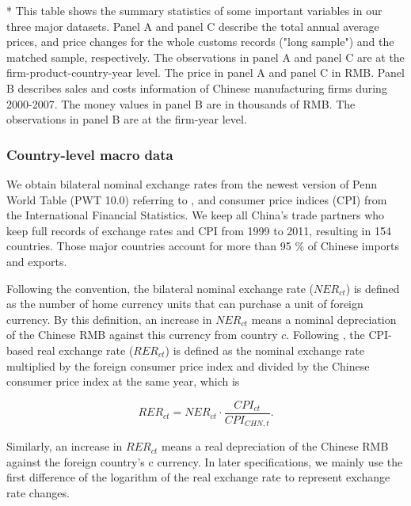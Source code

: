 \documentclass[12pt]{article}
\begin{document}
\begin{table}[htbp]
{\begin{threeparttable}
\begin{tabular}{lcccccc}
		\bottomrule
	\end{tabular}
	\begin{tablenotes}
		\footnotesize
		\item[*] This table shows the summary statistics of some important variables in our three major datasets. Panel A and panel C describe the total annual average prices, and price changes for the whole customs records ("long sample") and the matched sample, respectively. The observations in panel A and panel C are at the firm-product-country-year level. The price in panel A and panel C in RMB. Panel B describes sales and costs information of Chinese manufacturing firms during 2000-2007. The money values in panel B are in thousands of RMB. The observations in panel B are at the firm-year level.
	\end{tablenotes}
	\end{threeparttable}
        }
\end{table}

\subsubsection{Country-level macro data} \label{Data-Macro}

We obtain bilateral nominal exchange rates from the newest version of Penn World Table (PWT 10.0) referring to \cite{feenstra2015}, and consumer price indices (CPI) from the International Financial Statistics. We keep all China's trade partners who keep full records of exchange rates and CPI from 1999 to 2011, resulting in 154 countries. Those major countries account for more than 95 \% of Chinese imports and exports.

Following the convention, the bilateral nominal exchange rate ($NER_{ct}$) is defined as the number of home currency units that can purchase a unit of foreign currency. By this definition, an increase in $NER_{ct}$ means a nominal depreciation of the Chinese RMB against this currency from country $c$. Following \cite{lmx2015}, the CPI-based real exchange rate ($RER_{ct}$) is defined as the nominal exchange rate multiplied by the foreign consumer price index and divided by the Chinese consumer price index at the same year, which is

$$
RER_{ct}=NER_{ct} \cdot \frac{CPI_{ct}}{CPI_{CHN,t}}.
$$

Similarly, an increase in $RER_{ct}$ means a real depreciation of the Chinese RMB against the foreign country's c currency. In later specifications, we mainly use the first difference of the logarithm of the real exchange rate to represent exchange rate changes.
\end{document}
